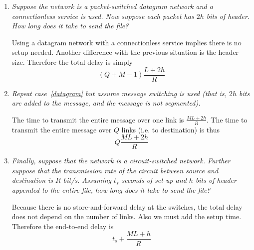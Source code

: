 \begin{enumerate}
\begin{enumerate}
        The time to transmit one packet onto a link is \(\frac{L +
          h}{R}\). The time to deliver the first of the \(M\) packets
        to the destination is \(Q{\frac{L+h}{R}}\). Every
        \(\frac{L+h}{R}\) seconds a new packet from the \(M-1\)
        remaining packets arrives at destination (this is due to
        pipelining). We must also add the initial setup time, because
        we use a VC network. Thus the total delay is
        \[
          t_{s} + (Q + M - 1){\frac{L+h}{R}}
        \]

      \item \label{datagram} \emph{Suppose the network is a
        packet-switched datagram network and a connectionless service
        is used. Now suppose each packet has \(2h\) bits of
        header. How long does it take to send the file?}

        Using a datagram network with a connectionless service implies
        there is no setup needed. Another difference with the previous
        situation is the header size. Therefore the total delay is
        simply
        \[
          (Q + M - 1){\frac{L + 2h}{R}}
        \]

      \item \emph{Repeat case~\ref{datagram} but assume message
        switching is used (that is, \(2h\) bits are added to the
        message, and the message is not segmented).}

        The time to transmit the entire message over one link is
        \(\frac{M L + 2h}{R}\). The time to transmit the entire
        message over \(Q\) links (i.e. to destination) is thus
        \[
          Q{\frac{M L + 2h}{R}}
        \]

      \item \emph{Finally, suppose that the network is a
        circuit-switched network. Further suppose that the
        transmission rate of the circuit between source and
        destination is \(R\) bit/s. Assuming \(t_s\) seconds of set-up
        and \(h\) bits of header appended to the entire file, how long
        does it take to send the file?}

        Because there is no store-and-forward delay at the switches,
        the total delay does not depend on the number of links. Also
        we must add the setup time. Therefore the end-to-end delay is
        \[
          t_{s} + \frac{M L + h}{R}
        \]

    \end{enumerate}


\end{enumerate}
